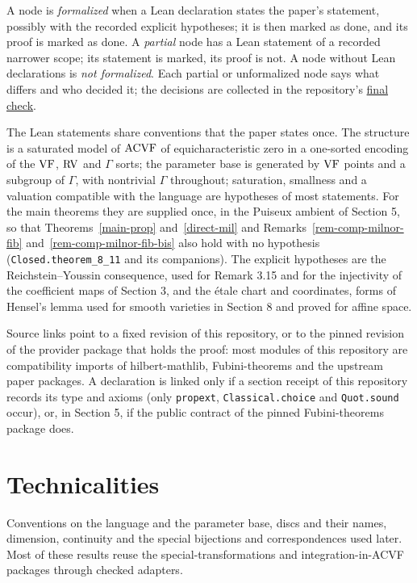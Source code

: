 A node is \emph{formalized} when a Lean declaration states the paper's statement, possibly with the recorded explicit hypotheses; it is then marked as done, and its proof is marked as done. A \emph{partial} node has a Lean statement of a recorded narrower scope; its statement is marked, its proof is not. A node without Lean declarations is \emph{not formalized}. Each partial or unformalized node says what differs and who decided it; the decisions are collected in the repository's \href{https://github.com/daviddhilbert/diamond-integral/blob/main/FINAL-CHECK.md}{final check}.

The Lean statements share conventions that the paper states once. The structure is a saturated model of $\mathrm{ACVF}$ of equicharacteristic zero in a one-sorted encoding of the $\mathrm{VF}$, $\mathrm{RV}$ and $\Gamma$ sorts; the parameter base is generated by $\mathrm{VF}$ points and a subgroup of $\Gamma$, with nontrivial $\Gamma$ throughout; saturation, smallness and a valuation compatible with the language are hypotheses of most statements. For the main theorems they are supplied once, in the Puiseux ambient of Section 5, so that Theorems~\ref{main-prop} and~\ref{direct-mil} and Remarks~\ref{rem-comp-milnor-fib} and~\ref{rem-comp-milnor-fib-bis} also hold with no hypothesis (\texttt{Closed.theorem\_8\_11} and its companions). The explicit hypotheses are the Reichstein--Youssin consequence, used for Remark 3.15 and for the injectivity of the coefficient maps of Section 3, and the \'etale chart and coordinates, forms of Hensel's lemma used for smooth varieties in Section 8 and proved for affine space.

Source links point to a fixed revision of this repository, or to the pinned revision of the provider package that holds the proof: most modules of this repository are compatibility imports of hilbert-mathlib, Fubini-theorems and the upstream paper packages. A declaration is linked only if a section receipt of this repository records its type and axioms (only \texttt{propext}, \texttt{Classical.choice} and \texttt{Quot.sound} occur), or, in Section 5, if the public contract of the pinned Fubini-theorems package does.

\section{Technicalities}
\label{section-2}
Conventions on the language and the parameter base, discs and their names, dimension, continuity and the special bijections and correspondences used later. Most of these results reuse the special-transformations and integration-in-ACVF packages through checked adapters.

